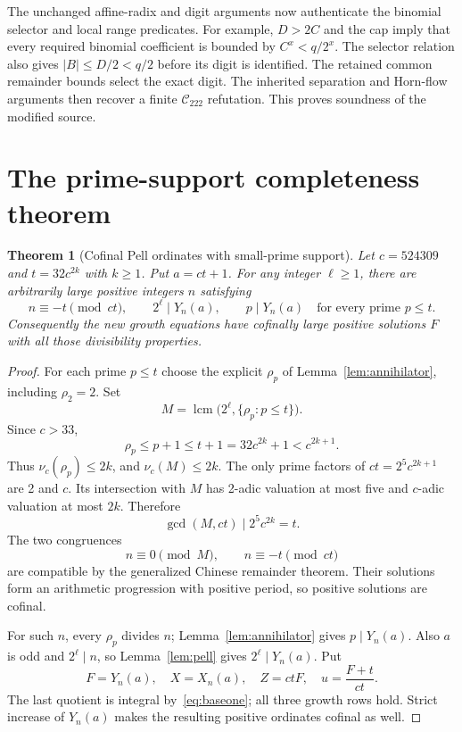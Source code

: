 \documentclass[11pt]{article}
\newtheorem{theorem}{Theorem}[section]
\theoremstyle{definition}
\theoremstyle{remark}
\newcommand{\lcm}{\operatorname{lcm}}
\newcommand{\vval}{\nu}
\newcommand{\Ccal}{\mathcal C_{222}}
\begin{document}
The unchanged affine-radix and digit arguments now authenticate the binomial
selector and local range predicates. For example, $D>2C$ and the cap imply
that every required binomial coefficient is bounded by $C^x<q/2^x$.
The selector relation also gives $|B|\le D/2<q/2$ before its digit is
identified. The retained common remainder bounds select the exact digit.
The inherited separation and Horn-flow arguments then recover a finite
$\Ccal$ refutation. This proves soundness of the modified source.

\newpage
\section{The prime-support completeness theorem}\label{sec:prime}

\begin{theorem}[Cofinal Pell ordinates with small-prime support]
\label{thm:primesupport}
Let $c=524309$ and $t=32c^{2k}$ with $k\ge1$. Put $a=ct+1$.
For any integer $\ell\ge1$, there are arbitrarily large positive integers
$n$ satisfying
\[
 n\equiv-t\pmod{ct},\qquad 2^\ell\mid Y_n(a),\qquad
 p\mid Y_n(a)\quad\text{for every prime }p\le t.
\]
Consequently the new growth equations have cofinally large positive
solutions $F$ with all those divisibility properties.
\end{theorem}
\begin{proof}
For each prime $p\le t$ choose the explicit $\rho_p$ of
Lemma~\ref{lem:annihilator}, including $\rho_2=2$. Set
\[
 M=\lcm\bigl(2^\ell,\{\rho_p:p\le t\}\bigr).
\]
Since $c>33$,
\[
 \rho_p\le p+1\le t+1=32c^{2k}+1<c^{2k+1}.
\]
Thus $\vval_c(\rho_p)\le2k$, and $\vval_c(M)\le2k$.
The only prime factors of $ct=2^5c^{2k+1}$ are 2 and $c$. Its
intersection with $M$ has 2-adic valuation at most five and $c$-adic
valuation at most $2k$. Therefore
\begin{equation}\label{eq:crtcompat}
 \gcd(M,ct)\mid 2^5c^{2k}=t.
\end{equation}
The two congruences
\[
 n\equiv0\pmod M,\qquad n\equiv-t\pmod{ct}
\]
are compatible by the generalized Chinese remainder theorem. Their
solutions form an arithmetic progression with positive period, so positive
solutions are cofinal.

For such $n$, every $\rho_p$ divides $n$; Lemma~\ref{lem:annihilator}
gives $p\mid Y_n(a)$. Also $a$ is odd and $2^\ell\mid n$, so
Lemma~\ref{lem:pell} gives $2^\ell\mid Y_n(a)$. Put
\[
 F=Y_n(a),\quad X=X_n(a),\quad Z=ctF,\quad
 u=\frac{F+t}{ct}.
\]
The last quotient is integral by~\eqref{eq:baseone}; all three growth
rows hold. Strict increase of $Y_n(a)$ makes the resulting positive
ordinates cofinal as well.
\end{proof}
\end{document}
